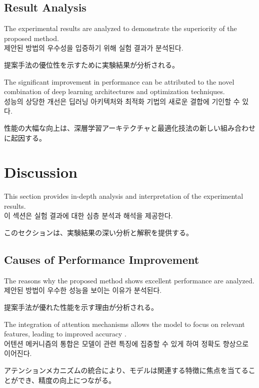 \documentclass[preprint,12pt]{elsarticle}
\begin{document}
\subsection{Result Analysis}
The experimental results are analyzed to demonstrate the superiority of the proposed method. \\
제안된 방법의 우수성을 입증하기 위해 실험 결과가 분석된다. \\
\begin{CJK}{UTF8}{min}
提案手法の優位性を示すために実験結果が分析される。
\end{CJK}

The significant improvement in performance can be attributed to the novel combination of deep learning architectures and optimization techniques. \\
성능의 상당한 개선은 딥러닝 아키텍처와 최적화 기법의 새로운 결합에 기인할 수 있다. \\
\begin{CJK}{UTF8}{min}
性能の大幅な向上は、深層学習アーキテクチャと最適化技法の新しい組み合わせに起因する。
\end{CJK}

\section{Discussion}
\label{sec:discussion}

This section provides in-depth analysis and interpretation of the experimental results. \\
이 섹션은 실험 결과에 대한 심층 분석과 해석을 제공한다. \\
\begin{CJK}{UTF8}{min}
このセクションは、実験結果の深い分析と解釈を提供する。
\end{CJK}

\subsection{Causes of Performance Improvement}
The reasons why the proposed method shows excellent performance are analyzed. \\
제안된 방법이 우수한 성능을 보이는 이유가 분석된다. \\
\begin{CJK}{UTF8}{min}
提案手法が優れた性能を示す理由が分析される。
\end{CJK}

The integration of attention mechanisms allows the model to focus on relevant features, leading to improved accuracy \cite{bahdanau2014neural}. \\
어텐션 메커니즘의 통합은 모델이 관련 특징에 집중할 수 있게 하여 정확도 향상으로 이어진다. \\
\begin{CJK}{UTF8}{min}
アテンションメカニズムの統合により、モデルは関連する特徴に焦点を当てることができ、精度の向上につながる。
\end{CJK}
\end{document}
